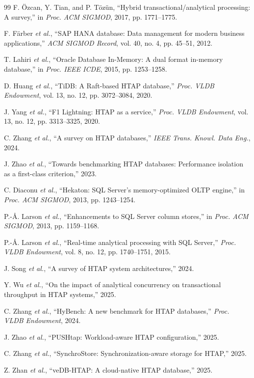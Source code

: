 \documentclass[conference,a4paper]{IEEEtran}
\begin{document}
\begin{thebibliography}{99}
 F. Özcan, Y. Tian, and P. Tözün, ``Hybrid
transactional/analytical processing: A survey,'' in \emph{Proc. ACM SIGMOD},
2017, pp. 1771--1775.

 F. Färber \emph{et al.}, ``SAP HANA database: Data
management for modern business applications,'' \emph{ACM SIGMOD Record},
vol. 40, no. 4, pp. 45--51, 2012.

 T. Lahiri \emph{et al.}, ``Oracle Database
In-Memory: A dual format in-memory database,'' in \emph{Proc. IEEE ICDE},
2015, pp. 1253--1258.

 D. Huang \emph{et al.}, ``TiDB: A Raft-based HTAP
database,'' \emph{Proc. VLDB Endowment}, vol. 13, no. 12, pp. 3072--3084, 2020.

 J. Yang \emph{et al.}, ``F1 Lightning: HTAP as a service,''
\emph{Proc. VLDB Endowment}, vol. 13, no. 12, pp. 3313--3325, 2020.

 C. Zhang \emph{et al.}, ``A survey on HTAP databases,''
\emph{IEEE Trans. Knowl. Data Eng.}, 2024.

 J. Zhao \emph{et al.}, ``Towards benchmarking
HTAP databases: Performance isolation as a first-class criterion,'' 2023.

 C. Diaconu \emph{et al.}, ``Hekaton: SQL Server's
memory-optimized OLTP engine,'' in \emph{Proc. ACM SIGMOD}, 2013,
pp. 1243--1254.

 P.-Å. Larson \emph{et al.}, ``Enhancements to
SQL Server column stores,'' in \emph{Proc. ACM SIGMOD}, 2013, pp. 1159--1168.

 P.-Å. Larson \emph{et al.}, ``Real-time analytical
processing with SQL Server,'' \emph{Proc. VLDB Endowment}, vol. 8, no. 12,
pp. 1740--1751, 2015.

 J. Song \emph{et al.}, ``A survey of HTAP system
architectures,'' 2024.

 Y. Wu \emph{et al.}, ``On the impact of analytical
concurrency on transactional throughput in HTAP systems,'' 2025.

 C. Zhang \emph{et al.}, ``HyBench: A new benchmark
for HTAP databases,'' \emph{Proc. VLDB Endowment}, 2024.

 J. Zhao \emph{et al.}, ``PUSHtap: Workload-aware
HTAP configuration,'' 2025.

 C. Zhang \emph{et al.}, ``SynchroStore:
Synchronization-aware storage for HTAP,'' 2025.

 Z. Zhan \emph{et al.}, ``veDB-HTAP: A cloud-native HTAP
database,'' 2025.
\end{thebibliography}
\end{document}
